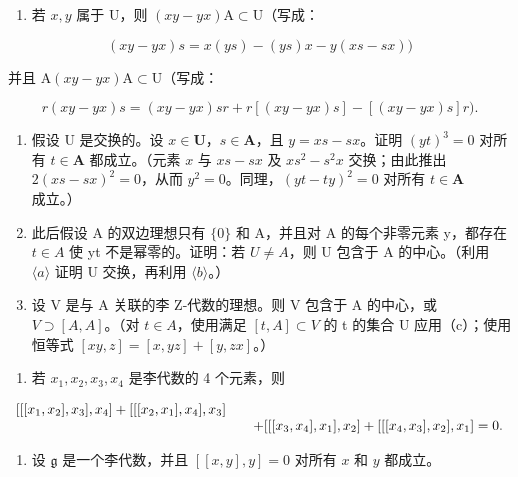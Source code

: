 \begin{enumerate}
\def\labelenumi{(\alph{enumi})}
\tightlist
\item
  若 \(x, y\) 属于 U，则 \((xy - yx)\mathrm{A} \subset \mathrm{U}\)（写成：
\end{enumerate}

\[
(x y - y x) s = x (y s) - (y s) x - y (x s - s x))
\]

并且 \(\mathrm{A}(xy - yx)\mathrm{A} \subset \mathrm{U}\)（写成：

\[
r (x y - y x) s = (x y - y x) s r + r [ (x y - y x) s ] - [ (x y - y x) s ] r).
\]

\begin{enumerate}
\def\labelenumi{(\alph{enumi})}
\setcounter{enumi}{1}
\item
  假设 U 是交换的。设 \(x \in \mathbf{U}\)，\(s \in \mathbf{A}\)，且 \(y = xs - sx\)。证明 \((yt)^3 = 0\) 对所有 \(t \in \mathbf{A}\) 都成立。（元素 \(x\) 与 \(xs - sx\) 及 \(xs^2 - s^2x\) 交换；由此推出 \(2(xs - sx)^2 = 0\)，从而 \(y^2 = 0\)。同理，\((yt - ty)^2 = 0\) 对所有 \(t \in \mathbf{A}\) 成立。）
\item
  此后假设 A 的双边理想只有 \(\{0\}\) 和 A，并且对 A 的每个非零元素 y，都存在 \(t \in A\) 使 yt 不是幂零的。证明：若 \(U \neq A\)，则 U 包含于 A 的中心。（利用 \(\langle a\rangle\) 证明 U 交换，再利用 \(\langle b\rangle\)。）
\item
  设 V 是与 A 关联的李 Z-代数的理想。则 V 包含于 A 的中心，或 \(V \supset [A, A]\)。（对 \(t \in A\)，使用满足 \([t, A] \subset V\) 的 t 的集合 U 应用（c）；使用恒等式 \([xy, z] = [x, yz] + [y, zx]\)。）
\end{enumerate}

\begin{enumerate}
\def\labelenumi{\arabic{enumi}.}
\setcounter{enumi}{7}
\tightlist
\item
  若 \(x_{1}, x_{2}, x_{3}, x_{4}\) 是李代数的 4 个元素，则
\end{enumerate}

\[
\begin{array}{r l} {[ [ [ x _ {1}, x _ {2} ], x _ {3} ], x _ {4} ] + [ [ [ x _ {2}, x _ {1} ], x _ {4} ], x _ {3} ]} & \\ & \quad + [ [ [ x _ {3}, x _ {4} ], x _ {1} ], x _ {2} ] + [ [ [ x _ {4}, x _ {3} ], x _ {2} ], x _ {1} ] = 0. \end{array}
\]

\begin{enumerate}
\def\labelenumi{\arabic{enumi}.}
\setcounter{enumi}{8}
\tightlist
\item
  设 \(\mathfrak{g}\) 是一个李代数，并且 \([[x,y],y] = 0\) 对所有 \(x\) 和 \(y\) 都成立。
\end{enumerate}

